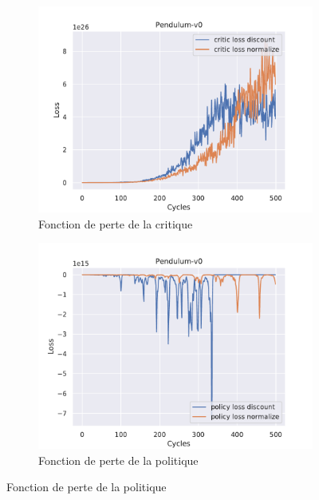 \begin{figure}[H]
    \centering
    \begin{subfigure}{0.3\textwidth}
        \includegraphics[width=\textwidth]{figures/iteration1/critic_loss_Pendulum-v0_pg_dataset_td_eval_True_cycles_500_trajs_20_batches_20_gamma_0.99_nstep_5_lr_act_0.01_lr_critic_0.01pg.pdf}
        \caption{Fonction de perte de la critique}
    \end{subfigure}
    \begin{subfigure}{0.3\textwidth}
        \includegraphics[width=\textwidth]{figures/iteration1/policy_loss_Pendulum-v0_pg_dataset_td_eval_True_cycles_500_trajs_20_batches_20_gamma_0.99_nstep_5_lr_act_0.01_lr_critic_0.01pg.pdf}
        \caption{Fonction de perte de la politique}

\end{subfigure}
\end{figure}
